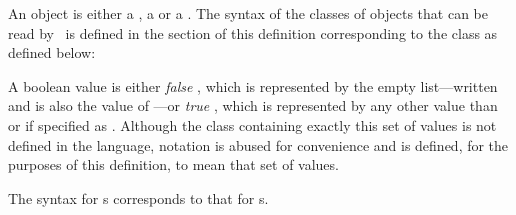 \begin{optDefinition}
An object is either a , a  or a .  The
syntax of the classes of objects that can be read by \eulisp\ is defined in the
section of this definition corresponding to the class as defined below:
%
\Syntax
\label{object-syntax}

A boolean value is either {\em false} , which is
represented by the empty list---written \nil{}\/ and is also the value of
---or {\em true} , which is represented by
any other value than \nil{} or if specified as \true.  Although the class
containing exactly this set of values is not defined in the language, notation
is abused for convenience and   is
defined, for the purposes of this definition, to mean that set of values.

The syntax for s 
 corresponds to that for s.

\end{optDefinition}

